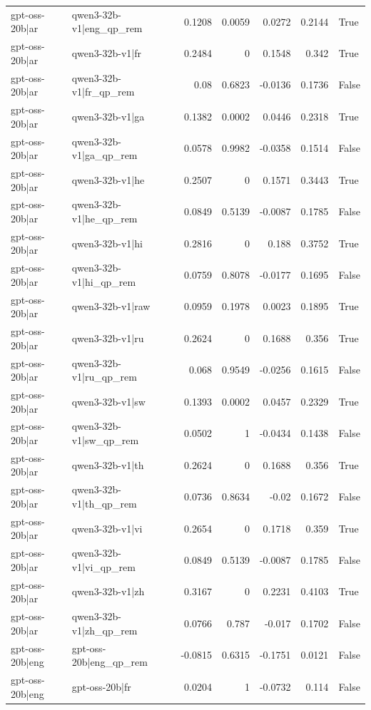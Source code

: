 \begin{table}
\begin{tabular}{l l r r r r l}
gpt-oss-20b|ar & qwen3-32b-v1|eng_qp_rem & 0.1208 & 0.0059 & 0.0272 & 0.2144 & True \\
gpt-oss-20b|ar & qwen3-32b-v1|fr & 0.2484 & 0 & 0.1548 & 0.342 & True \\
gpt-oss-20b|ar & qwen3-32b-v1|fr_qp_rem & 0.08 & 0.6823 & -0.0136 & 0.1736 & False \\
gpt-oss-20b|ar & qwen3-32b-v1|ga & 0.1382 & 0.0002 & 0.0446 & 0.2318 & True \\
gpt-oss-20b|ar & qwen3-32b-v1|ga_qp_rem & 0.0578 & 0.9982 & -0.0358 & 0.1514 & False \\
gpt-oss-20b|ar & qwen3-32b-v1|he & 0.2507 & 0 & 0.1571 & 0.3443 & True \\
gpt-oss-20b|ar & qwen3-32b-v1|he_qp_rem & 0.0849 & 0.5139 & -0.0087 & 0.1785 & False \\
gpt-oss-20b|ar & qwen3-32b-v1|hi & 0.2816 & 0 & 0.188 & 0.3752 & True \\
gpt-oss-20b|ar & qwen3-32b-v1|hi_qp_rem & 0.0759 & 0.8078 & -0.0177 & 0.1695 & False \\
gpt-oss-20b|ar & qwen3-32b-v1|raw & 0.0959 & 0.1978 & 0.0023 & 0.1895 & True \\
gpt-oss-20b|ar & qwen3-32b-v1|ru & 0.2624 & 0 & 0.1688 & 0.356 & True \\
gpt-oss-20b|ar & qwen3-32b-v1|ru_qp_rem & 0.068 & 0.9549 & -0.0256 & 0.1615 & False \\
gpt-oss-20b|ar & qwen3-32b-v1|sw & 0.1393 & 0.0002 & 0.0457 & 0.2329 & True \\
gpt-oss-20b|ar & qwen3-32b-v1|sw_qp_rem & 0.0502 & 1 & -0.0434 & 0.1438 & False \\
gpt-oss-20b|ar & qwen3-32b-v1|th & 0.2624 & 0 & 0.1688 & 0.356 & True \\
gpt-oss-20b|ar & qwen3-32b-v1|th_qp_rem & 0.0736 & 0.8634 & -0.02 & 0.1672 & False \\
gpt-oss-20b|ar & qwen3-32b-v1|vi & 0.2654 & 0 & 0.1718 & 0.359 & True \\
gpt-oss-20b|ar & qwen3-32b-v1|vi_qp_rem & 0.0849 & 0.5139 & -0.0087 & 0.1785 & False \\
gpt-oss-20b|ar & qwen3-32b-v1|zh & 0.3167 & 0 & 0.2231 & 0.4103 & True \\
gpt-oss-20b|ar & qwen3-32b-v1|zh_qp_rem & 0.0766 & 0.787 & -0.017 & 0.1702 & False \\
gpt-oss-20b|eng & gpt-oss-20b|eng_qp_rem & -0.0815 & 0.6315 & -0.1751 & 0.0121 & False \\
gpt-oss-20b|eng & gpt-oss-20b|fr & 0.0204 & 1 & -0.0732 & 0.114 & False \\

\end{tabular}
\end{table}
